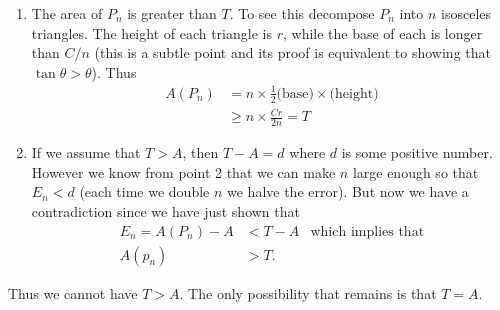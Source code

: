 \begin{enumerate}
\item The area of $P_n$ is greater than $T$. To see this decompose $P_n$ into $n$
isosceles triangles. The height of each triangle is $r$, while the base of each is longer
than $C/n$ (this is a subtle point and its proof is equivalent to showing that $\tan
\theta > \theta$). Thus
\begin{align*}
  A(P_n) &= n \times \frac{1}{2} \text{(base)}\times \text{(height)} \\
  & \geq n \times \frac{Cr}{2n} = T
\end{align*}

\item If we assume that $T>A$, then $T-A = d$ where $d$ is some positive number.
However we know from point 2 that we can make $n$ large enough so that $E_n < d$ (each
time we double $n$ we halve the error). But now we have a contradiction since we have just
shown that
\begin{align*}
  E_n = A(P_n) - A & < T-A & \text{which implies that}\\
  A(p_n) & > T.
\end{align*}
\end{enumerate}
Thus we cannot have $T>A$. The only possibility that remains is that $T=A$.


